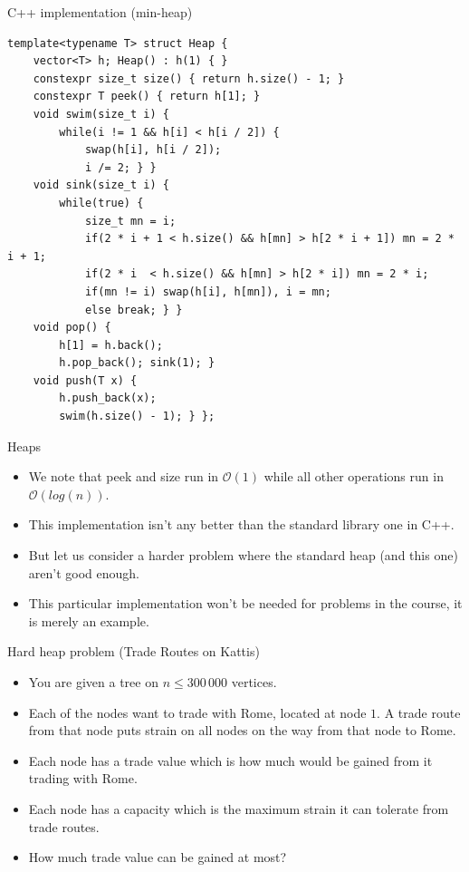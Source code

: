 \documentclass{beamer}
\begin{document}
\begin{frame}{C++ implementation (min-heap)}
    \scriptsize
    \begin{verbatim}
template<typename T> struct Heap {
    vector<T> h; Heap() : h(1) { }
    constexpr size_t size() { return h.size() - 1; }
    constexpr T peek() { return h[1]; }
    void swim(size_t i) {
        while(i != 1 && h[i] < h[i / 2]) {
            swap(h[i], h[i / 2]);
            i /= 2; } }
    void sink(size_t i) {
        while(true) {
            size_t mn = i;
            if(2 * i + 1 < h.size() && h[mn] > h[2 * i + 1]) mn = 2 * i + 1;
            if(2 * i  < h.size() && h[mn] > h[2 * i]) mn = 2 * i;
            if(mn != i) swap(h[i], h[mn]), i = mn;
            else break; } }
    void pop() {
        h[1] = h.back();
        h.pop_back(); sink(1); }
    void push(T x) {
        h.push_back(x);
        swim(h.size() - 1); } };
    \end{verbatim}
\end{frame}

\begin{frame}[plain]{Heaps}
    \begin{itemize}
        \item We note that peek and size run in $\mathcal{O}(1)$ while all other operations run in $\mathcal{O}(log(n))$.
        \item This implementation isn't any better than the standard library one in C++.
        \item But let us consider a harder problem where the standard heap (and this one) aren't good enough.
        \item This particular implementation won't be needed for problems in the course, it is merely an example.
    \end{itemize}
\end{frame}

\begin{frame}[plain]{Hard heap problem (Trade Routes on Kattis)}
    \begin{itemize}
        \item You are given a tree on $n \leq 300\,000$ vertices.
        \item Each of the nodes want to trade with Rome, located at node $1$. A trade route from that node puts strain on all nodes on the way from that node to Rome.
        \item Each node has a trade value which is how much would be gained from it trading with Rome.
        \item Each node has a capacity which is the maximum strain it can tolerate from trade routes.
        \item How much trade value can be gained at most?
    \end{itemize}
\end{frame}
\end{document}
